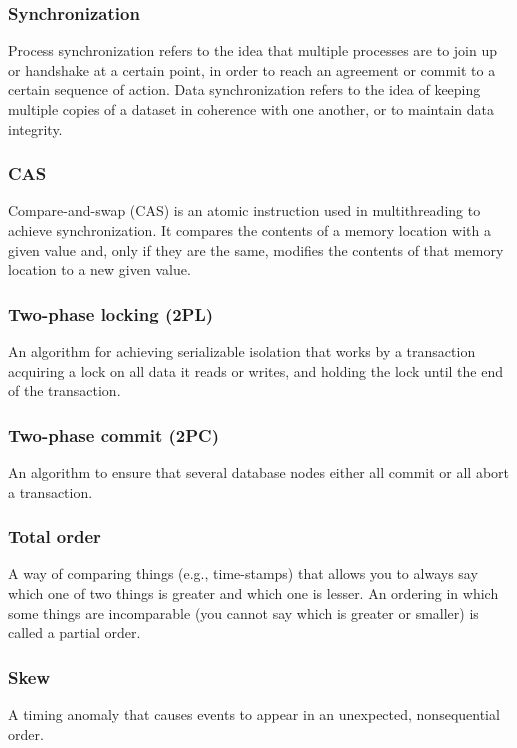 \documentclass{article}
\begin{document}
    \subsubsection{Synchronization}
    Process synchronization refers to the idea that multiple processes are to join up or handshake at a certain point, in order to reach an agreement or commit to a certain sequence of action. Data synchronization refers to the idea of keeping multiple copies of a dataset in coherence with one another, or to maintain data integrity.
    
    \subsubsection{CAS}
    Compare-and-swap (CAS) is an atomic instruction used in multithreading to achieve synchronization. It compares the contents of a memory location with a given value and, only if they are the same, modifies the contents of that memory location to a new given value.
    
    \subsubsection{Two-phase locking (2PL)}
    An algorithm for achieving serializable isolation that works by a transaction acquiring a lock on all data it reads or writes, and holding the lock until the end of the transaction.
    
    \subsubsection{Two-phase commit (2PC)}
    An algorithm to ensure that several database nodes either all commit or all abort a transaction.
    
    \subsubsection{Total order}
    A way of comparing things (e.g., time-stamps) that allows you to always say which one of two things is greater and which one is lesser. An ordering in which some things are incomparable (you cannot say which is greater or smaller) is called a partial order.
    
    \subsubsection{Skew}
    A timing anomaly that causes events to appear in an unexpected, nonsequential order.
\end{document}
